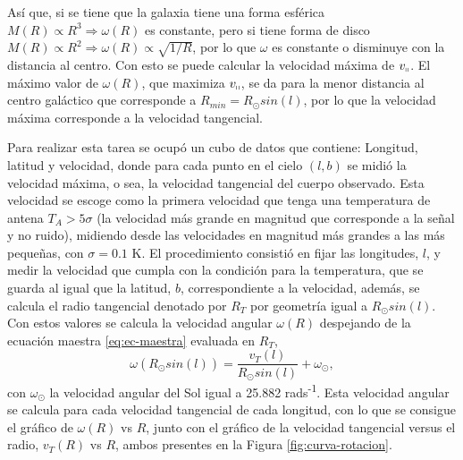 \documentclass[letterpaper,oneside]{article}
\begin{document}
Así que, si se tiene que la galaxia tiene una forma esférica $M(R) \propto R^3\Rightarrow\omega(R)$ es constante, pero si tiene forma de disco $M(R) \propto R^2\Rightarrow\omega(R)\propto \sqrt{1/R}$, por lo que $\omega$ es constante o disminuye con la distancia al centro. Con esto se puede calcular la velocidad máxima de $v_{\shortparallel}$. El máximo valor de  $\omega(R)$, que maximiza $v_{\shortparallel}$, se da para la menor distancia al centro galáctico que corresponde a $R_{min}=R_{\odot}sin(l)$, por lo que la velocidad máxima corresponde a la velocidad tangencial.


Para realizar esta tarea se ocupó un cubo de datos que contiene: Longitud, latitud y velocidad, donde para cada punto en el cielo $(l,b)$ se midió la velocidad máxima, o sea, la velocidad tangencial del cuerpo observado. Esta velocidad se escoge como la primera velocidad que tenga una temperatura de antena $T_A>5\sigma$ (la velocidad más grande en magnitud que corresponde a la señal y no ruido), midiendo desde las velocidades en magnitud más grandes a las más pequeñas, con $\sigma =0.1$ \si{\kelvin}. El procedimiento consistió en fijar las longitudes, $l$, y medir la velocidad que cumpla con la condición para la temperatura, que se guarda al igual que la latitud, $b$, correspondiente a la velocidad, además, se calcula el radio tangencial denotado por $R_T$ por geometría igual a $R_{\odot}sin(l)$. Con estos valores se calcula la velocidad angular $\omega(R)$ despejando de la ecuación maestra \ref{eq:ec-maestra} evaluada en $R_T$,
\begin{equation*}
\omega(R_{\odot}sin(l))=\frac{v_T(l)}{R_{\odot}sin(l)}+\omega_{\odot},
\end{equation*}
con $\omega_{\odot}$ la velocidad angular del Sol igual a 25.882 rads\textsuperscript{-1}. Esta velocidad angular se calcula para cada velocidad tangencial de cada longitud, con lo que se consigue el gráfico de $\omega(R)$ vs $R$, junto con el gráfico de la velocidad tangencial versus el radio, $v_T(R)$ vs $R$, ambos presentes en la Figura \ref{fig:curva-rotacion}.

\end{document}
